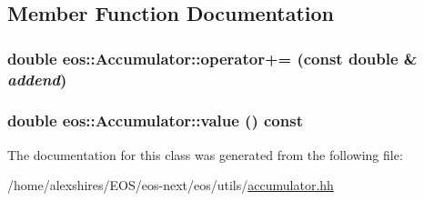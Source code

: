 \subsection{Member Function Documentation}
\hypertarget{classeos_1_1Accumulator_a8cbd4477f50751394afc7c445640de79}{
\subsubsection[{operator+=}]{\setlength{\rightskip}{0pt plus 5cm}double eos::Accumulator::operator+= (const double \& {\em addend})}}
\label{classeos_1_1Accumulator_a8cbd4477f50751394afc7c445640de79}
\hypertarget{classeos_1_1Accumulator_a6fc737db7b42656c0435c9d6cedb62b0}{
\subsubsection[{value}]{\setlength{\rightskip}{0pt plus 5cm}double eos::Accumulator::value () const}}
\label{classeos_1_1Accumulator_a6fc737db7b42656c0435c9d6cedb62b0}


The documentation for this class was generated from the following file:\begin{DoxyCompactItemize}
\item 
/home/alexshires/EOS/eos-\/next/eos/utils/\hyperlink{accumulator_8hh}{accumulator.hh}\end{DoxyCompactItemize}
